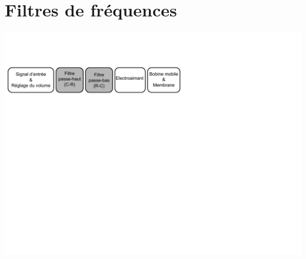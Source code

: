 \chapter{Filtres de fréquences}

\begin{center}
\includegraphics[width=\textwidth]{img/Schemabloc2}
\end{center}







